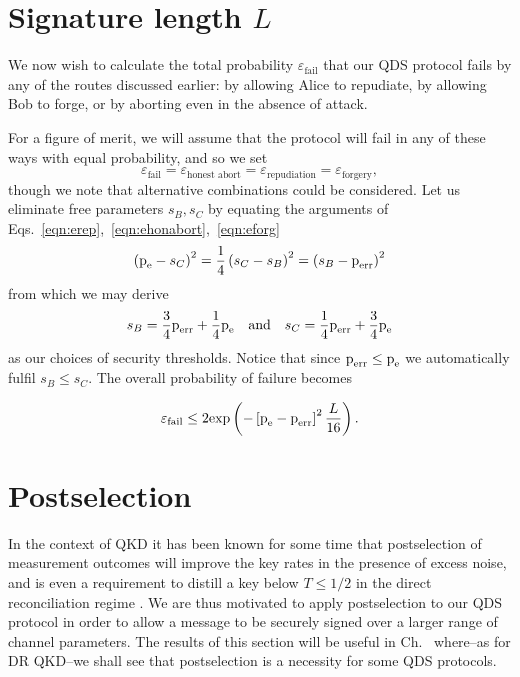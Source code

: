 \section{Signature length $L$}
We now wish to calculate the total probability $\varepsilon_{\text{fail}}$ that our QDS protocol fails by any of the routes discussed earlier: by allowing Alice to repudiate, by allowing Bob to forge, or by aborting even in the absence of attack.

For a figure of merit, we will assume that the protocol will fail in any of these ways with equal probability, and so we set
\begin{equation}
\varepsilon_{\text{fail}} = \varepsilon_{\text{honest abort}} = \varepsilon_{\text{repudiation}} = \varepsilon_{\text{forgery}},
\end{equation}
though we note that alternative combinations could be considered. Let us eliminate free parameters $s_B, s_C$ by equating the arguments of Eqs.~\ref{eqn:erep},~\ref{eqn:ehonabort},~\ref{eqn:eforg}
\begin{equation}
\left(\text{p}_{\text{e}} - s_C\right)^2  = \frac{1}{4}\left(s_C - s_B\right)^2 = \left(s_B - \text{p}_{\text{err}}\right)^2
\end{equation}
from which we may derive
\begin{equation}
s_B = \frac{3}{4} \perr + \frac{1}{4}\pe \qq{and} s_C = \frac{1}{4}\perr + \frac{3}{4}\pe
\end{equation}
as our choices of security thresholds. Notice that since $\text{p}_{\text{err}} \le \text{p}_{\text{e}}$ we automatically fulfil $s_B \le s_C$. The overall probability of failure becomes

\begin{equation}\label{eqn:efail}
\varepsilon_{\text{fail}} \le 2 \text{exp}\left( - \left[\text{p}_{\text{e}} - \text{p}_{\text{err}}\right]^2 \frac{L}{16}\right).
\end{equation}




\section{Postselection}
In the context of QKD it has been known for some time that postselection of measurement outcomes will improve the key rates in the presence of excess noise, and is even a requirement to distill a key below $T \le 1/2$ in the direct reconciliation regime . We are thus motivated to apply postselection to our QDS protocol in order to allow a message to be securely signed over a larger range of channel parameters. The results of this section will be useful in Ch.~ where--as for DR QKD--we shall see that postselection is a necessity for some QDS protocols.

